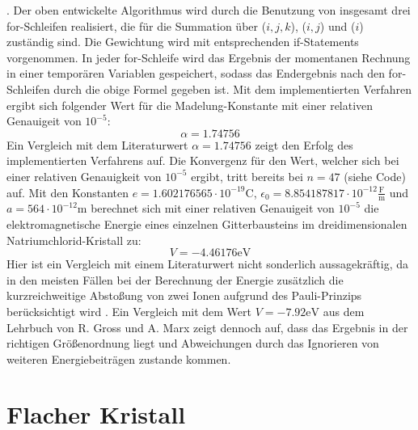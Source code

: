 \documentclass[11pt,a4paper]{article}
\begin{document}
. Der oben entwickelte Algorithmus wird durch die Benutzung von insgesamt drei for-Schleifen realisiert, die für die Summation über ($i,j,k$), ($i,j$) und ($i$) zuständig sind. Die Gewichtung wird mit entsprechenden if-Statements vorgenommen. In jeder for-Schleife wird das Ergebnis der momentanen Rechnung in einer temporären Variablen gespeichert,
sodass das Endergebnis nach den for-Schleifen durch die obige Formel gegeben ist. Mit dem implementierten Verfahren ergibt sich folgender Wert für die Madelung-Konstante mit einer relativen Genauigeit von $10^{-5}$:
\begin{equation*}
    \alpha = 1.74756
\end{equation*} Ein Vergleich mit dem Literaturwert $\alpha = 1.74756$ \cite{key4} zeigt den Erfolg des implementierten Verfahrens auf. Die Konvergenz für den Wert, welcher sich bei einer relativen Genauigkeit von $10^{-5}$ ergibt, tritt bereits bei $n=47$ (siehe Code) auf.
Mit den Konstanten \cite{key4} $e = 1.602176565 \cdot 10^{-19} \si{\coulomb}$, $\epsilon_0 = 8.854187817 \cdot 10^{-12}\frac{\si{\farad}}{\si{\metre}}$ und $a = 564 \cdot 10^{-12} \si{\metre}$ berechnet sich mit einer relativen Genauigeit von $10^{-5}$ die elektromagnetische Energie eines einzelnen Gitterbausteins im dreidimensionalen Natriumchlorid-Kristall zu:
\begin{equation*}
    V = -4.46176 \si{\electronvolt}
\end{equation*} Hier ist ein Vergleich mit einem Literaturwert nicht sonderlich aussagekräftig, da in den meisten Fällen bei der Berechnung der Energie zusätzlich die kurzreichweitige Abstoßung von zwei Ionen aufgrund des Pauli-Prinzips berücksichtigt wird \cite{key4}. Ein Vergleich mit dem Wert $V = -7.92 \si{\electronvolt}$
aus dem Lehrbuch von R. Gross und A. Marx zeigt dennoch auf, dass das Ergebnis in der richtigen Größenordnung liegt und Abweichungen durch das Ignorieren von weiteren Energiebeiträgen zustande kommen.


\section*{Flacher Kristall}\label{sec:flach}
\end{document}
